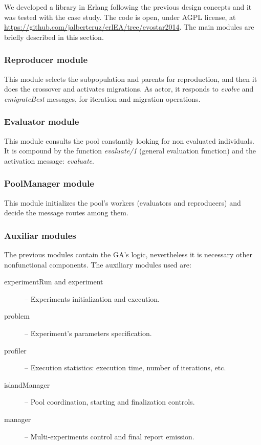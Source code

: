 
We developed a library in Erlang following the previous design concepts and it was tested with the case study. The code is open, under AGPL license, at \url{https://github.com/jalbertcruz/erlEA/tree/evostar2014}. The main modules are briefly described in this section. %

\subsubsection{Reproducer module}

This module selects the subpopulation and parents for reproduction, and then it does the crossover and activates migrations. As actor, it responds to {\em evolve} and {\em emigrateBest} messages, for iteration and migration operations.

\subsubsection{Evaluator module}

This module consults the pool constantly looking for non evaluated individuals. It is compound by the function {\em evaluate/1} (general evaluation function) and the activation message: {\em evaluate}.

\subsubsection{PoolManager module}

This module initializes the pool’s workers (evaluators and reproducers) and decide the message routes among them.

\subsubsection{Auxiliar modules}

The previous modules contain the GA’s logic, nevertheless it is necessary other nonfunctional components. The auxiliary modules used are:
\vspace{.35cm}

\begin{description}

  \item[experimentRun and experiment] -- Experiments initialization and execution.

  \item[problem] -- Experiment’s parameters specification.

  \item[profiler] -- Execution statistics: execution time, number of iterations, etc.

  \item[islandManager] -- Pool coordination, starting and finalization controls.

  \item[manager] -- Multi-experiments control and final report emission.

\end{description} 